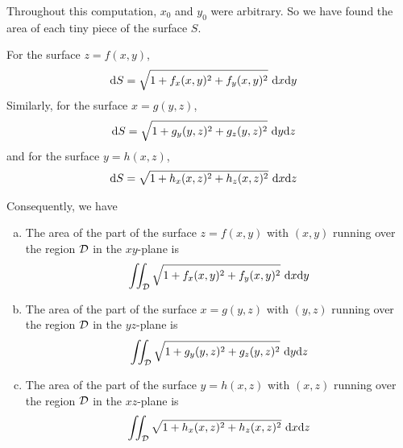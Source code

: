 Throughout this computation, $x_0$ and $y_0$ were arbitrary.
So we have found the area of each tiny piece of the surface $S$.
\begin{impeqn}\label{eq dSgraph}
For the surface $z=f(x,y)$,
\begin{align*}
\dee{S}&= \sqrt{1 + f_x(x,y)^2 + f_y(x,y)^2}\ 
          \dee{x}\dee{y}
\end{align*}
Similarly, for the surface $x=g(y,z)$, 
\begin{align*}
\dee{S}&= \sqrt{1 + g_y(y,z)^2 + g_z(y,z)^2}\ 
          \dee{y}\dee{z}
\end{align*}
and for the surface $y=h(x,z)$,
\begin{align*}
\dee{S}&= \sqrt{1 + h_x(x,z)^2 + h_z(x,z)^2}\ 
          \dee{x}\dee{z}
\end{align*}
\end{impeqn}
Consequently, we have
\begin{theorem}\label{thm surface area}
\begin{enumerate}[(a)]
\item
The area of the part of the surface $z=f(x,y)$ with $(x,y)$ running over the
region $\mathcal{D}$ in the $xy$-plane is
\begin{equation*}
\dblInt_\cD \sqrt{1 + f_x(x,y)^2 + f_y(x,y)^2}\ 
          \dee{x}\dee{y}
\end{equation*}
\item
The area of the part of the surface $x=g(y,z)$ with $(y,z)$ running over the
region $\mathcal{D}$ in the $yz$-plane is
\begin{equation*}
\dblInt_\cD \sqrt{1 + g_y(y,z)^2 + g_z(y,z)^2}\ 
          \dee{y}\dee{z}
\end{equation*}

\item
The area of the part of the surface $y=h(x,z)$ with $(x,z)$ running over the
region $\mathcal{D}$ in the $xz$-plane is
\begin{equation*}
\dblInt_\cD \sqrt{1 + h_x(x,z)^2 + h_z(x,z)^2}\ 
          \dee{x}\dee{z}
\end{equation*}
\end{enumerate}
\end{theorem}
